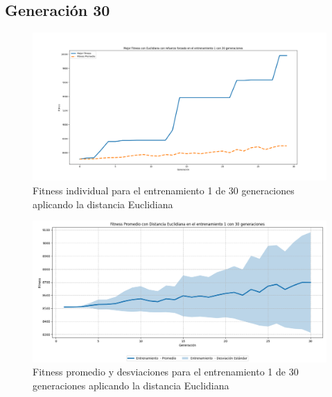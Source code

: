 \documentclass[conference]{IEEEtran}
\begin{document}
\subsection{Generación 30}
\setcounter{figure}{0}
\renewcommand{\thefigure}{S\arabic{figure}B-E}
\begin{figure}[H]
    \centering
    \includegraphics[width=0.9 \linewidth]{Euclidiana/Fitness_individual_30/Fitness_1_Eucli_30Gen.png}
    \caption{Fitness individual para el entrenamiento 1 de 30 generaciones aplicando la distancia Euclidiana}
    \label{fig:eucli_1_30}
\end{figure}
\begin{figure}[H]
    \centering
    \includegraphics[width=0.9 \linewidth]{Euclidiana/Fitness_individual_30/Fitness_1_Eucli_30Gen_Sombra.png}
    \caption{Fitness promedio y desviaciones para el entrenamiento 1 de 30 generaciones aplicando la distancia Euclidiana}
    \label{fig:eucli_1_30_sombra}
\end{figure}
\end{document}

